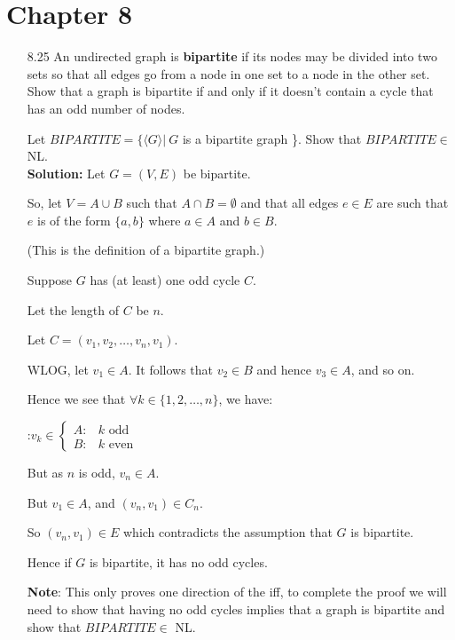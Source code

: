 \section{Chapter 8}
\begin{enumerate}

\item[8.25] An undirected graph is \textbf{bipartite} if its nodes may be divided
into two sets so that all edges go from a node in one set to a node in the other set.
Show that a graph is bipartite if and only if it doesn't contain a cycle that has
an odd number of nodes.

Let $BIPARTITE = \{ \langle G \rangle | \ G$ is a bipartite graph \}. Show that
$BIPARTITE \in$ NL.
\\
\textbf{Solution:}
Let $G=(V,E)$ be bipartite.

So, let $V=A \cup B$ such that $A \cap B = \emptyset$ and that all edges $e \in E$
are such that $e$ is of the form $\{a,b\}$ where $a \in A$ and $b \in B$.

(This is the definition of a bipartite graph.)

Suppose $G$ has (at least) one odd cycle $C$.

Let the length of $C$ be $n$.

Let $C=(v_1,v_2,…,v_n,v_1)$.

WLOG, let $v_1 \in A$. It follows that $v_2 \in B$ and hence $v_3 \in A$, and so on.

Hence we see that $\forall k \in \{1,2,…,n\}$, we have:

:$v_k \in \begin{cases}
A : & k \text{ odd} \\
B : & k \text{ even}
\end{cases}$

But as $n$ is odd, $v_n \in A$.

But $v_1 \in A$, and $(v_n,v_1) \in C_n$.

So $(v_n, v_1) \in E$ which contradicts the assumption that $G$ is bipartite.

Hence if $G$ is bipartite, it has no odd cycles.

\textbf{Note}: This only proves one direction of the iff, to complete the proof we will need
to show that having no odd cycles implies that a graph is bipartite and show that
$BIPARTITE \in$ NL.

\end{enumerate}
